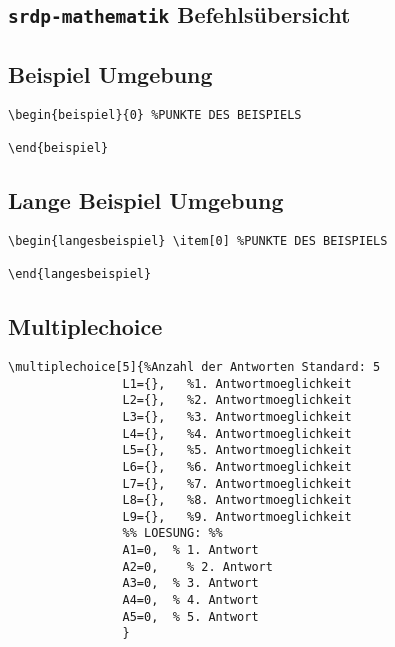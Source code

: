 \documentclass[a4paper,12pt]{report}
\begin{document}
\begin{scriptsize}
\section{\texttt{srdp-mathematik} Befehlsübersicht}\leer

\begin{minipage}{0.5\textwidth}
\subsection{Beispiel Umgebung}
\begin{verbatim}
\begin{beispiel}{0} %PUNKTE DES BEISPIELS

\end{beispiel}
\end{verbatim}
\end{minipage}\begin{minipage}{0.5\textwidth}
\subsection{Lange Beispiel Umgebung}
\begin{verbatim}
\begin{langesbeispiel} \item[0] %PUNKTE DES BEISPIELS

\end{langesbeispiel}
\end{verbatim}
\end{minipage}\leer


\begin{minipage}{0.5\textwidth}
\subsection{Multiplechoice}
\begin{verbatim}
\multiplechoice[5]{%Anzahl der Antworten Standard: 5
				L1={},   %1. Antwortmoeglichkeit 
				L2={},   %2. Antwortmoeglichkeit
				L3={},   %3. Antwortmoeglichkeit
				L4={},   %4. Antwortmoeglichkeit
				L5={},	 %5. Antwortmoeglichkeit
				L6={},	 %6. Antwortmoeglichkeit
				L7={},	 %7. Antwortmoeglichkeit
				L8={},	 %8. Antwortmoeglichkeit
				L9={},	 %9. Antwortmoeglichkeit
				%% LOESUNG: %%
				A1=0,  % 1. Antwort
				A2=0,	 % 2. Antwort
				A3=0,  % 3. Antwort
				A4=0,  % 4. Antwort
				A5=0,  % 5. Antwort
				}
\end{verbatim}
\end{minipage}\begin{minipage}{0.5\textwidth}

\end{minipage}
\end{scriptsize}
\end{document}
